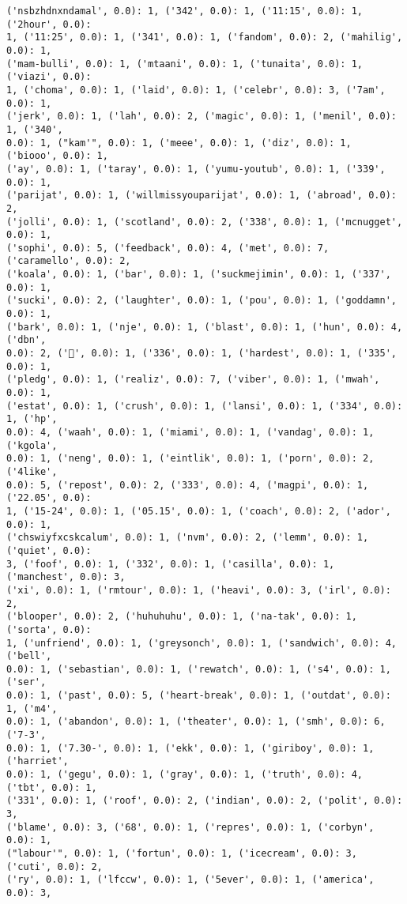 \documentclass[11pt]{article}
\begin{document}
\begin{Verbatim}[commandchars=\\\{\}]
('nsbzhdnxndamal', 0.0): 1, ('342', 0.0): 1, ('11:15', 0.0): 1, ('2hour', 0.0):
1, ('11:25', 0.0): 1, ('341', 0.0): 1, ('fandom', 0.0): 2, ('mahilig', 0.0): 1,
('mam-bulli', 0.0): 1, ('mtaani', 0.0): 1, ('tunaita', 0.0): 1, ('viazi', 0.0):
1, ('choma', 0.0): 1, ('laid', 0.0): 1, ('celebr', 0.0): 3, ('7am', 0.0): 1,
('jerk', 0.0): 1, ('lah', 0.0): 2, ('magic', 0.0): 1, ('menil', 0.0): 1, ('340',
0.0): 1, ("kam'", 0.0): 1, ('meee', 0.0): 1, ('diz', 0.0): 1, ('biooo', 0.0): 1,
('ay', 0.0): 1, ('taray', 0.0): 1, ('yumu-youtub', 0.0): 1, ('339', 0.0): 1,
('parijat', 0.0): 1, ('willmissyouparijat', 0.0): 1, ('abroad', 0.0): 2,
('jolli', 0.0): 1, ('scotland', 0.0): 2, ('338', 0.0): 1, ('mcnugget', 0.0): 1,
('sophi', 0.0): 5, ('feedback', 0.0): 4, ('met', 0.0): 7, ('caramello', 0.0): 2,
('koala', 0.0): 1, ('bar', 0.0): 1, ('suckmejimin', 0.0): 1, ('337', 0.0): 1,
('sucki', 0.0): 2, ('laughter', 0.0): 1, ('pou', 0.0): 1, ('goddamn', 0.0): 1,
('bark', 0.0): 1, ('nje', 0.0): 1, ('blast', 0.0): 1, ('hun', 0.0): 4, ('dbn',
0.0): 2, ('🎀', 0.0): 1, ('336', 0.0): 1, ('hardest', 0.0): 1, ('335', 0.0): 1,
('pledg', 0.0): 1, ('realiz', 0.0): 7, ('viber', 0.0): 1, ('mwah', 0.0): 1,
('estat', 0.0): 1, ('crush', 0.0): 1, ('lansi', 0.0): 1, ('334', 0.0): 1, ('hp',
0.0): 4, ('waah', 0.0): 1, ('miami', 0.0): 1, ('vandag', 0.0): 1, ('kgola',
0.0): 1, ('neng', 0.0): 1, ('eintlik', 0.0): 1, ('porn', 0.0): 2, ('4like',
0.0): 5, ('repost', 0.0): 2, ('333', 0.0): 4, ('magpi', 0.0): 1, ('22.05', 0.0):
1, ('15-24', 0.0): 1, ('05.15', 0.0): 1, ('coach', 0.0): 2, ('ador', 0.0): 1,
('chswiyfxcskcalum', 0.0): 1, ('nvm', 0.0): 2, ('lemm', 0.0): 1, ('quiet', 0.0):
3, ('foof', 0.0): 1, ('332', 0.0): 1, ('casilla', 0.0): 1, ('manchest', 0.0): 3,
('xi', 0.0): 1, ('rmtour', 0.0): 1, ('heavi', 0.0): 3, ('irl', 0.0): 2,
('blooper', 0.0): 2, ('huhuhuhu', 0.0): 1, ('na-tak', 0.0): 1, ('sorta', 0.0):
1, ('unfriend', 0.0): 1, ('greysonch', 0.0): 1, ('sandwich', 0.0): 4, ('bell',
0.0): 1, ('sebastian', 0.0): 1, ('rewatch', 0.0): 1, ('s4', 0.0): 1, ('ser',
0.0): 1, ('past', 0.0): 5, ('heart-break', 0.0): 1, ('outdat', 0.0): 1, ('m4',
0.0): 1, ('abandon', 0.0): 1, ('theater', 0.0): 1, ('smh', 0.0): 6, ('7-3',
0.0): 1, ('7.30-', 0.0): 1, ('ekk', 0.0): 1, ('giriboy', 0.0): 1, ('harriet',
0.0): 1, ('gegu', 0.0): 1, ('gray', 0.0): 1, ('truth', 0.0): 4, ('tbt', 0.0): 1,
('331', 0.0): 1, ('roof', 0.0): 2, ('indian', 0.0): 2, ('polit', 0.0): 3,
('blame', 0.0): 3, ('68', 0.0): 1, ('repres', 0.0): 1, ('corbyn', 0.0): 1,
("labour'", 0.0): 1, ('fortun', 0.0): 1, ('icecream', 0.0): 3, ('cuti', 0.0): 2,
('ry', 0.0): 1, ('lfccw', 0.0): 1, ('5ever', 0.0): 1, ('america', 0.0): 3,

\end{Verbatim}
\end{document}
